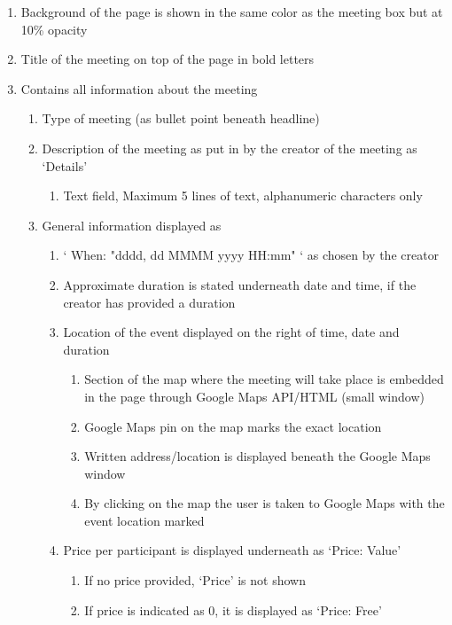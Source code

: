 \documentclass[conference]{IEEEtran}
\begin{document}
\begin{enumerate}
    \item Background of the page is shown in the same color as the meeting box but at 10\% opacity
    \item Title of the meeting on top of the page in bold letters
    \item Contains all information about the meeting
    \begin{enumerate}
        \item Type of meeting (as bullet point beneath headline)
        \item Description of the meeting as put in by the creator of the meeting as ‘Details’
        \begin{enumerate}
            \item Text field, Maximum 5 lines of text, alphanumeric characters only
        \end{enumerate}
        \item General information displayed as
        \begin{enumerate}
            \item ‘ When: "dddd, dd MMMM yyyy HH:mm" ‘ as chosen by the creator
            \item Approximate duration is stated underneath date and time, if the creator has provided a duration
            \item Location of the event displayed on the right of time, date and duration
            \begin{enumerate}
                \item Section of the map where the meeting will take place is embedded in the page through Google Maps API/HTML (small window)
                \item Google Maps pin on the map marks the exact location
                \item Written address/location is displayed beneath the Google Maps window
                \item By clicking on the map the user is taken to Google Maps with the event location marked
            \end{enumerate}
            \item Price per participant is displayed underneath as ‘Price: Value’
            \begin{enumerate}
                \item If no price provided, ‘Price’ is not shown
                \item If price is indicated as 0, it is displayed as ‘Price: Free’

\end{enumerate}
\end{enumerate}
\end{enumerate}
\end{enumerate}
\end{document}

